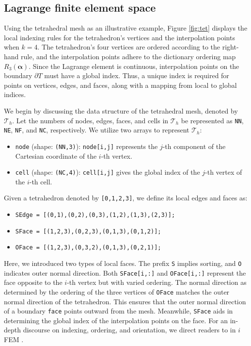 \documentclass[12pt, a4paper]{article}
\newcommand{\mc}{\mcode}
\begin{document}
\subsection{Lagrange finite element space}
Using the tetrahedral mesh as an illustrative example, Figure \ref{fig:tet} displays the local indexing rules for the tetrahedron's vertices and the interpolation points when \(k=4\). The tetrahedron's four vertices are ordered according to the right-hand rule, and the interpolation points adhere to the dictionary ordering map \(R_3(\boldsymbol \alpha)\). Since the Lagrange element is continuous, interpolation points on the boundary \(\partial T\) must have a global index. Thus, a unique index is required for points on vertices, edges, and faces, along with a mapping from local to global indices.

We begin by discussing the data structure of the tetrahedral mesh, denoted by \(\mathcal T_h\). Let the numbers of nodes, edges, faces, and cells in \(\mathcal T_h\) be represented as \lstinline{NN}, \lstinline{NE}, \lstinline{NF}, and \lstinline{NC}, respectively. We utilize two arrays to represent \(\mathcal T_h\):
\begin{itemize}
  \item \lstinline{node} (shape: \lstinline{(NN,3)}): \lstinline{node[i,j]} represents the $j$-th component of the Cartesian coordinate of the $i$-th vertex.
  \item \lstinline{cell} (shape: \lstinline{(NC,4)}): \lstinline{cell[i,j]} gives the global index of the $j$-th vertex of the $i$-th cell.
\end{itemize}
Given a tetrahedron denoted by \lstinline{[0,1,2,3]}, we define its local edges and faces as:
\begin{itemize}
  \item \lstinline{SEdge = [(0,1),(0,2),(0,3),(1,2),(1,3),(2,3)];}
  \item \lstinline{SFace = [(1,2,3),(0,2,3),(0,1,3),(0,1,2)];}
  \item \lstinline{OFace = [(1,2,3),(0,3,2),(0,1,3),(0,2,1)];}
\end{itemize}
Here, we introduced two types of local faces. The prefix \lstinline{S} implies sorting, and \lstinline{O} indicates outer normal direction. Both \lstinline{SFace[i,:]} and \lstinline{OFace[i,:]} represent the face opposite to the $i$-th vertex but with varied ordering. The normal direction as determined by the ordering of the three vertices of \lstinline{OFace} matches the outer normal direction of the tetrahedron. This ensures that the outer normal direction of a boundary \lstinline{face} points outward from the mesh. Meanwhile, \lstinline{SFace} aids in determining the global index of the interpolation points on the face. For an in-depth discourse on indexing, ordering, and orientation, we direct readers to \mc{sc3} in $i$FEM \cite{Chen.L2008c}.
\end{document}
